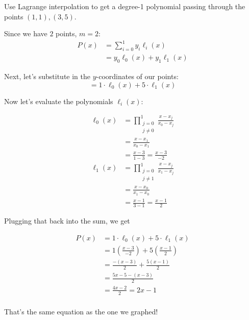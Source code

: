 \begin{example}
Use Lagrange interpolation to get a degree-1 polynomial passing through the points 
$(1,1), (3,5)$.

Since we have $2$ points, $m=2$:
\begin{align*}
    P(x) &= \sum_{i=0}^{1} y_i \ell_i(x)\\
    &= y_0 \ell_0(x) + y_1 \ell_1(x)
\end{align*}

Next, let's substitute in the $y$-coordinates of our points:
\[
    = 1 \cdot \ell_0(x) + 5 \cdot \ell_1(x)
\]

Now let's evaluate the polynomials $\ell_i(x)$:

\begin{align*}
    \ell_0(x) &= \prod_{\substack{j=0\\j\neq 0}}^{1} \frac{x-x_j}{x_0-x_j}\\
    &= \frac{x-x_1}{x_0-x_1}\\
    &= \frac{x-3}{1-3}
    = \frac{x-3}{-2}\\
    \ell_1(x) &= \prod_{\substack{j=0\\j\neq 1}}^{1} \frac{x-x_j}{x_1-x_j}\\
    &= \frac{x-x_0}{x_1-x_0}\\
    &= \frac{x-1}{3-1}
    = \frac{x-1}{2}
\end{align*}

Plugging that back into the sum, we get

\begin{align*}
    P(x) &= 1 \cdot \ell_0(x) + 5 \cdot \ell_1(x)\\
    &= 1 \left(\frac{x-3}{-2}\right) + 5 \left(\frac{x-1}{2}\right)\\
    &= \frac{-(x-3)}{2} + \frac{5(x-1)}{2}\\
    &= \frac{5x-5-(x-3)}{2}\\
    &= \frac{4x-2}{2}
    = 2x-1\\
\end{align*}

That's the same equation as the one we graphed!
\end{example}

